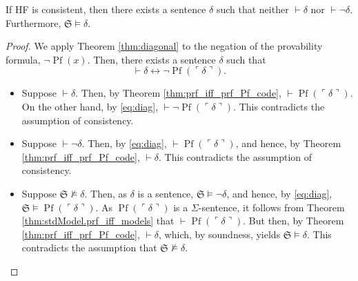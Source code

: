 \begin{theorem}
    \label{thm:first_incompleteness}
    \leanok
    If HF is consistent, then there exists a sentence $\delta$ such that
    neither $\vdash \delta$ nor $\vdash \neg \delta$. 
    Furthermore, $\mathfrak{S} \vDash \delta$.
\end{theorem}

\setcounter{equation}{0}
\begin{proof}
    \leanok
    We apply Theorem \ref{thm:diagonal} to the negation of the provability formula, 
    $\neg\operatorname{Pf}(x)$.
    Then, there exists a sentence $\delta$ such that
    \begin{equation}
        \label{eq:diag}
        \vdash \delta \leftrightarrow \neg \operatorname{Pf}(\ulcorner{\delta}\urcorner).
    \end{equation}
    \begin{itemize}
        \item Suppose $\vdash \delta$. Then, by Theorem \ref{thm:prf_iff_prf_Pf_code},
        $\vdash \operatorname{Pf}(\ulcorner{\delta}\urcorner)$.
        On the other hand, by \ref{eq:diag}, 
        $\vdash \neg \operatorname{Pf}(\ulcorner{\delta}\urcorner)$.
        This contradicts the assumption of consistency.
        \item Suppose $\vdash \neg \delta$. Then, by \ref{eq:diag},
        $\vdash \operatorname{Pf}(\ulcorner{\delta}\urcorner)$, and hence, by
        Theorem \ref{thm:prf_iff_prf_Pf_code}, $\vdash \delta$.
        This contradicts the assumption of consistency.
        \item Suppose $\mathfrak{S} \not\vDash \delta$. 
        Then, as $\delta$ is a sentence, $\mathfrak{S} \vDash \neg\delta$, and hence,
        by \ref{eq:diag}, $\mathfrak{S} \vDash \operatorname{Pf}(\ulcorner{\delta}\urcorner)$.
        As $\operatorname{Pf}(\ulcorner{\delta}\urcorner)$ is a $\Sigma$-sentence, it follows from 
        Theorem \ref{thm:stdModel.prf_iff_models} that
        $\vdash \operatorname{Pf}(\ulcorner{\delta}\urcorner)$. 
        But then, by Theorem \ref{thm:prf_iff_prf_Pf_code}, $\vdash \delta$,
        which, by soundness, yields $\mathfrak{S} \vDash \delta$.
        This contradicts the assumption that $\mathfrak{S} \not\vDash \delta$.
    \end{itemize}

\end{proof}